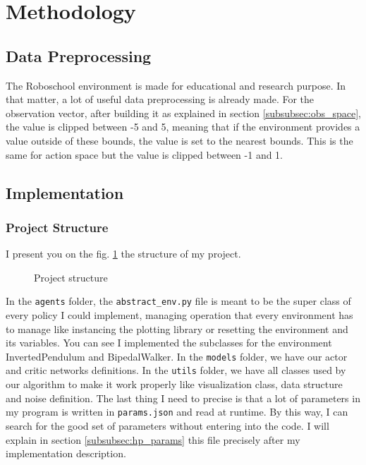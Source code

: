 \documentclass{article}
\begin{document}
\newpage
\section{Methodology}

\subsection{Data Preprocessing}

The Roboschool environment is made for educational and research purpose. In that
matter, a lot of useful data preprocessing is already made. For the observation
vector, after building it as explained in section \ref{subsubsec:obs_space}, the
value is clipped between -5 and 5, meaning that if the environment provides a
value outside of these bounds, the value is set to the nearest bounds. This is
the same for action space but the value is clipped between -1 and 1. 

\subsection{Implementation}

\subsubsection{Project Structure}

I present you on the fig. \ref{fig:structure} the structure of my project.

\begin{figure}[ht]
\caption{Project structure}
\label{fig:structure}
\end{figure}

In the \verb?agents? folder, the \verb?abstract_env.py? file is meant to be the
super class of every policy I could implement, managing operation that every
environment has to manage like instancing the plotting library or resetting the
environment and its variables. You can see I implemented the subclasses for the
environment InvertedPendulum and BipedalWalker. In the \verb?models? folder, we
have our actor and critic networks definitions. In the \verb?utils? folder, we
have all classes used by our algorithm to make it work properly like
visualization class, data structure and noise definition. The last thing I need
to precise is that a lot of parameters in my program is written in
\verb?params.json? and read at runtime. By this way, I can search for the good
set of parameters without entering into the code. I will explain in section
\ref{subsubsec:hp_params} this file precisely after my implementation description.
\end{document}
